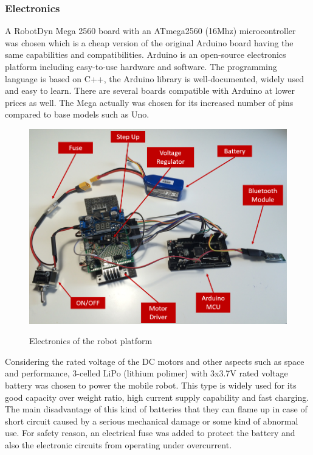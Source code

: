 \documentclass[12pt,english,twoside]{article}
\begin{document}
\subsubsection{Electronics}
A RobotDyn Mega 2560 board with an ATmega2560 (16Mhz) microcontroller was chosen which is a cheap version of the original Arduino board having the same capabilities and compatibilities. Arduino is an open-source electronics platform including easy-to-use hardware and software. \cite{arduino} The programming language is based on C++, the Arduino library is well-documented, widely used and easy to learn. There are several boards compatible with Arduino at lower prices as well. The Mega actually was chosen for its increased number of pins compared to base models such as Uno.
\begin{figure}[htb!]
	\centering
	\includegraphics[width=\textwidth]{figures/electronics.png}
	\label{electronics}
	\caption{Electronics of the robot platform}
\end{figure}

Considering the rated voltage of the DC motors and other aspects such as space and performance, 3-celled LiPo (lithium polimer) with 3x3.7V rated voltage battery was chosen to power the mobile robot. This type is widely used for its good capacity over weight ratio, high current supply capability and fast charging. The main disadvantage of this kind of batteries that they can flame up in case of short circuit caused by a serious mechanical damage or some kind of abnormal use. For safety reason, an electrical fuse was added to protect the battery and also the electronic circuits from operating under overcurrent. 
\end{document}
